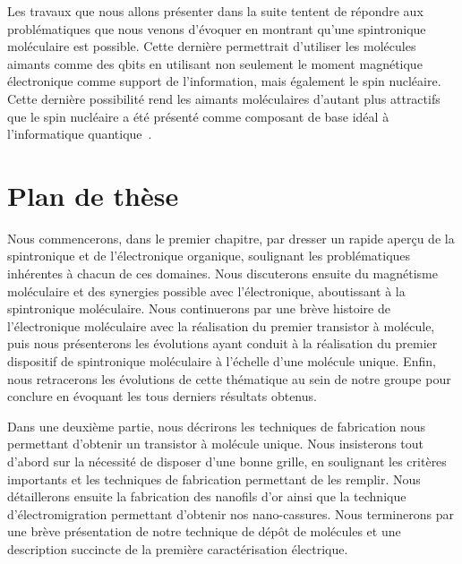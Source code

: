 Les travaux que nous allons présenter dans la suite tentent de répondre aux problématiques que nous venons d'évoquer en montrant qu'une spintronique moléculaire est possible. Cette dernière permettrait d'utiliser les molécules aimants comme des qbits en utilisant non seulement le moment magnétique électronique comme support de l'information, mais également le spin nucléaire. Cette dernière possibilité rend les aimants moléculaires d'autant plus attractifs que le spin nucléaire a été présenté comme composant de base idéal à l'informatique quantique~\cite{Kane1998}.

\newpage
 
\section*{Plan de thèse}

Nous commencerons, dans le premier chapitre, par dresser un rapide aperçu de la spintronique et de l'électronique organique, soulignant les problématiques inhérentes à  chacun de ces domaines. Nous discuterons ensuite du magnétisme moléculaire et des synergies possible avec l'électronique, aboutissant à la spintronique moléculaire. Nous continuerons par une brève histoire de l'électronique moléculaire avec la réalisation du premier transistor à molécule, puis nous présenterons les évolutions ayant conduit à la réalisation du premier dispositif de spintronique moléculaire à l'échelle d'une molécule unique. Enfin, nous retracerons les évolutions de cette thématique au sein de notre groupe pour conclure en évoquant les tous derniers résultats obtenus.

Dans une deuxième partie, nous décrirons les techniques de fabrication nous permettant d'obtenir un transistor à molécule unique. Nous insisterons tout d'abord sur la nécessité de disposer d'une bonne grille, en soulignant les critères importants et les techniques de fabrication permettant de les remplir. Nous détaillerons ensuite la fabrication des nanofils d'or ainsi que la technique d'électromigration permettant d'obtenir nos nano-cassures. Nous terminerons par une brève présentation de notre technique de dépôt de molécules et une description succincte de la première caractérisation électrique.

